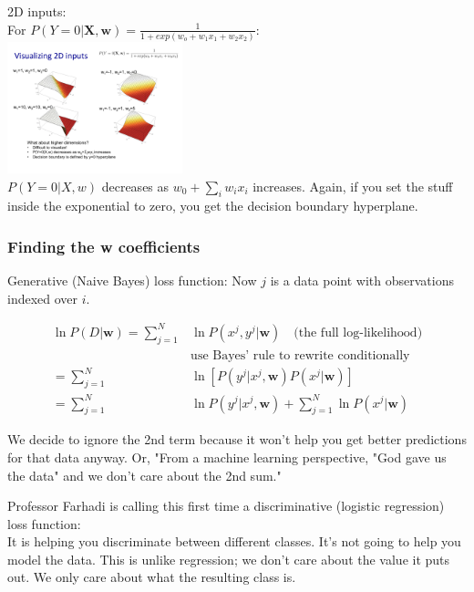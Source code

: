 2D inputs: \hfill \\
For $ \displaystyle P(Y=0 | \bm{X,w}) = \frac{1}{1 + exp(w_o + w_1 x_1 + w_2 x_2)}$:  \hfill \\
\includegraphics[width=2in]{figures/decision_boundary_example-2D.pdf}   \hfill \\

$P(Y=0 | X, w)$ decreases as $w_0 + \sum_i w_i x_i$ increases. 
Again, if you set the stuff inside the exponential to zero, you get the decision boundary hyperplane.

\subsubsection{Finding the w coefficients}
Generative (Naive Bayes) loss function: 
Now $j$ is a data point with observations indexed over $i$.


\begin{align*}
	\ln P(D | \bm{w}) = \sum_{j=1}^N  &  \ln P(x^j, y^j | \bm{w}) \mbox{   } \mbox{    (the full log-likelihood)}\\
					& \mbox{use Bayes' rule to rewrite conditionally}  \\  %
					= \sum_{j=1}^N  &  \ln [P(y^j | x^j, \bm{w}) P(x^j | \bm{w})] \\ %
				=  \sum_{j=1}^N  & \ln P(y^j | x^j , \bm{w}) + \sum_{j=1}^N \ln P(x^j | \bm{w})
\end{align*}

We decide to ignore the 2nd term because it won't help you get better predictions for that data anyway. 
Or, "From a machine learning perspective, "God gave us the data" and we don't care about the 2nd sum."  %

Professor Farhadi is calling this first time a discriminative (logistic regression) loss function:  \hfill \\
It is helping you discriminate between different classes.  It's not going to help you model the data. 
This is unlike regression; we don't care about the value it puts out.  We only care about what the resulting class is.  \hfill \\

